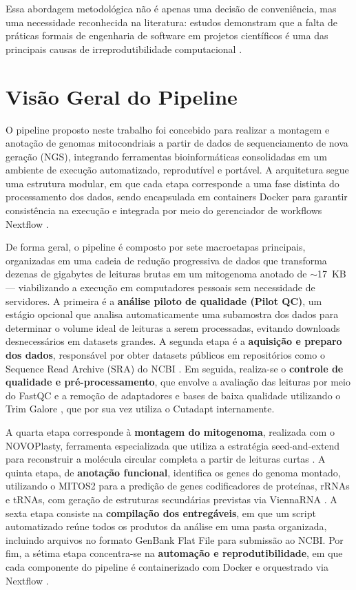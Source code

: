 Essa abordagem metodológica não é apenas uma decisão de conveniência, mas uma necessidade reconhecida na literatura: estudos demonstram que a falta de práticas formais de engenharia de software em projetos científicos é uma das principais causas de irreprodutibilidade computacional \cite{baker2016,peng2011}.

\section{Visão Geral do Pipeline}

O pipeline proposto neste trabalho foi concebido para realizar a montagem e anotação de genomas mitocondriais a partir de dados de sequenciamento de nova geração (NGS), integrando ferramentas bioinformáticas consolidadas em um ambiente de execução automatizado, reprodutível e portável. A arquitetura segue uma estrutura modular, em que cada etapa corresponde a uma fase distinta do processamento dos dados, sendo encapsulada em containers Docker para garantir consistência na execução \cite{merkel2014} e integrada por meio do gerenciador de workflows Nextflow \cite{ditommaso2017}.

De forma geral, o pipeline é composto por sete macroetapas principais, organizadas em uma cadeia de redução progressiva de dados que transforma dezenas de gigabytes de leituras brutas em um mitogenoma anotado de $\sim$17~KB --- viabilizando a execução em computadores pessoais sem necessidade de servidores. A primeira é a \textbf{análise piloto de qualidade (Pilot QC)}, um estágio opcional que analisa automaticamente uma subamostra dos dados para determinar o volume ideal de leituras a serem processadas, evitando downloads desnecessários em datasets grandes. A segunda etapa é a \textbf{aquisição e preparo dos dados}, responsável por obter datasets públicos em repositórios como o Sequence Read Archive (SRA) do NCBI \cite{leinonen2011}. Em seguida, realiza-se o \textbf{controle de qualidade e pré-processamento}, que envolve a avaliação das leituras por meio do FastQC \cite{andrews2010} e a remoção de adaptadores e bases de baixa qualidade utilizando o Trim Galore \cite{babraham2019}, que por sua vez utiliza o Cutadapt \cite{martin2011} internamente.

A quarta etapa corresponde à \textbf{montagem do mitogenoma}, realizada com o NOVOPlasty, ferramenta especializada que utiliza a estratégia seed-and-extend para reconstruir a molécula circular completa a partir de leituras curtas \cite{dierckxsens2017}. A quinta etapa, de \textbf{anotação funcional}, identifica os genes do genoma montado, utilizando o MITOS2 \cite{donath2019} para a predição de genes codificadores de proteínas, rRNAs e tRNAs, com geração de estruturas secundárias previstas via ViennaRNA \cite{lorenz2011}. A sexta etapa consiste na \textbf{compilação dos entregáveis}, em que um script automatizado reúne todos os produtos da análise em uma pasta organizada, incluindo arquivos no formato GenBank Flat File para submissão ao NCBI. Por fim, a sétima etapa concentra-se na \textbf{automação e reprodutibilidade}, em que cada componente do pipeline é containerizado com Docker \cite{merkel2014} e orquestrado via Nextflow \cite{ditommaso2017}.


